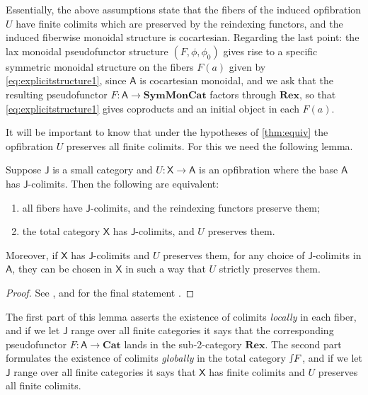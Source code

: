 \documentclass[ a4paper, onecolumn, superscriptaddress,10pt, accepted=2022-02-14, issue=3, volume=4, shorttitle=papers/compositionality-4-3 ]{compositionalityarticle}
\let\maps\colon
\newcommand{\A}{\mathsf{A}}
\newcommand{\J}{\mathsf{J}}
\newcommand{\X}{\mathsf{X}}
\newcommand{\bicat}{\mathbf}
\newcommand{\Cat}{\bicat{Cat}}
\newcommand{\Rex}{\bicat{Rex}}
\newcommand{\SMC}{\bicat{SymMonCat}}
\newcommand{\inta}{\raisebox{.3\depth}{$\smallint\hspace{-.01in}$}}
\begin{document}
Essentially, the above assumptions state that the fibers of the induced opfibration $U$ have finite colimits which are preserved by the reindexing functors, and the induced fiberwise monoidal structure is cocartesian. Regarding the last point: the lax monoidal pseudofunctor structure $(F,\phi,\phi_0)$ gives rise to a specific symmetric monoidal structure on the fibers $F(a)$ given by \cref{eq:explicitstructure1}, since $\A$ is cocartesian monoidal, and we ask that the resulting pseudofunctor $F\maps \A \to \SMC$ factors through $\Rex$, so that \cref{eq:explicitstructure1} gives coproducts and an initial object in each $F(a)$.
\fi

It will be important to know that under the hypotheses of
\cref{thm:equiv} the opfibration $U$ preserves all finite colimits.   For this we need the following lemma.

\begin{lem} \label{lem:fibrewiselimits}
Suppose $\J$ is a small category and $U \maps \X \to \A$ is an opfibration where the base $\A$ has $\J$-colimits.  Then the following are equivalent:
\begin{enumerate}
 \item all fibers have $\J$-colimits, and the reindexing functors preserve them;
 \item the total category $\X$ has $\J$-colimits, and $U$ preserves them.
\end{enumerate}
Moreover, if $\X$ has $\J$-colimits and $U$ preserves them, for any choice of $\J$-colimits in $\A$, they can be chosen in $\X$ in such a way that $U$ strictly preserves them.
\end{lem}

\begin{proof}
See \cite[Corollary~4.9]{Hermida1999}, and for the final statement \cite[Remark~4.11]{Hermida1999}.
\end{proof}

The first part of this lemma asserts the existence of colimits \emph{locally} in each fiber, and if we let $\J$ range over all finite categories it says that the corresponding pseudofunctor $F \maps \A \to \Cat$ lands in the sub-2-category $\Rex$. The second part formulates the existence of colimits \emph{globally} in the total category $\inta F$, and if we let $\J$ range over all finite categories it says that $\X$ has finite colimits and $U$ preserves all finite colimits.
\end{document}

